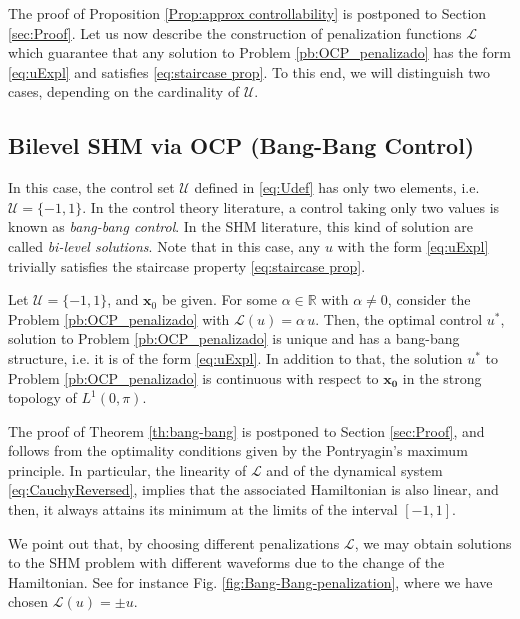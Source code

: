\documentclass[twocolumn]{autart}    %
\begin{document}
The proof of Proposition \ref{Prop:approx controllability} is postponed to Section \ref{sec:Proof}. Let us now describe the construction of penalization functions $\mathcal{L}$ which guarantee that any solution to Problem \ref{pb:OCP_penalizado} has the form \eqref{eq:uExpl} and satisfies \eqref{eq:staircase prop}. To this end, we will distinguish two cases, depending on the cardinality of $\mathcal{U}$.

\subsection{Bilevel SHM via OCP (Bang-Bang Control)} 

In this case, the control set $\mathcal{U}$ defined in \eqref{eq:Udef} has only two elements, i.e.  $\mathcal{U}=\{-1,1\}$.
In the control theory literature, a control taking only two values is known as \emph{bang-bang control}. In the SHM literature, this kind of solution are called \textit{bi-level solutions}. Note that in this case, any $u$ with the form \eqref{eq:uExpl}  trivially satisfies the staircase property \eqref{eq:staircase prop}.

\vspace{0.5em}
\begin{theorem}\label{th:bang-bang}
	Let $\mathcal{U}=\{ -1, 1\}$, and $\bm{x}_0$ be given.  For some $\alpha\in \mathbb{R}$ with $\alpha\neq 0$, consider the Problem \ref{pb:OCP_penalizado} with $\mathcal{L} (u) = \alpha\, u$. Then, the optimal control $u^\ast$, solution to Problem \ref{pb:OCP_penalizado} is unique and has a bang-bang structure, i.e. it is of the form \eqref{eq:uExpl}. In addition to that, the solution $u^\ast$ to Problem \ref{pb:OCP_penalizado} is continuous  with respect to $\bm{x_0}$ in the strong topology of $L^1(0,\pi)$.
\end{theorem}

The proof of Theorem \ref{th:bang-bang} is postponed to Section \ref{sec:Proof}, and follows from the optimality conditions given by the Pontryagin's maximum principle. In particular, the linearity of $\mathcal{L}$ and of the dynamical system \eqref{eq:CauchyReversed}, implies that the associated Hamiltonian is also linear, and then, it always attains its minimum at the limits of the interval $[-1,1]$.

We point out that, by choosing different penalizations $\mathcal{L}$, we may obtain solutions to the SHM problem with different waveforms due to the change of the Hamiltonian. See for instance Fig. \ref{fig:Bang-Bang-penalization}, where we have chosen $\mathcal{L}(u) = \pm u$.
\end{document}
